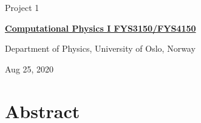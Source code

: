 \documentclass[%
oneside,                 %
final,                   %
10pt]{article}
\begin{document}

\newcommand{\exercisesection}[1]{\subsection*{#1}}






\thispagestyle{empty}

\begin{center}
{\LARGE\bf
\begin{spacing}{1.25}
Project 1
\end{spacing}
}
\end{center}


\begin{center}
{\bf \href{{http://www.uio.no/studier/emner/matnat/fys/FYS3150/index-eng.html}}{Computational Physics I FYS3150/FYS4150}}
\end{center}

    \begin{center}
\centerline{{\small Department of Physics, University of Oslo, Norway}}
\end{center}
    

\begin{center}
Aug 25, 2020
\end{center}

\vspace{1cm}

\section{Abstract}
\end{document}
